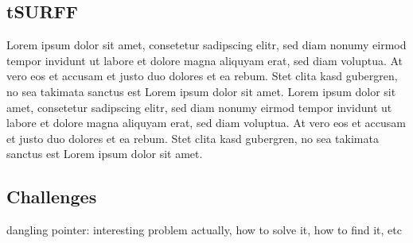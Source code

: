 \subsection{tSURFF}
Lorem ipsum dolor sit amet, consetetur sadipscing elitr, sed diam nonumy eirmod tempor invidunt ut labore et dolore magna aliquyam erat, sed diam voluptua. At vero eos et accusam et justo duo dolores et ea rebum. Stet clita kasd gubergren, no sea takimata sanctus est Lorem ipsum dolor sit amet. Lorem ipsum dolor sit amet, consetetur sadipscing elitr, sed diam nonumy eirmod tempor invidunt ut labore et dolore magna aliquyam erat, sed diam voluptua. At vero eos et accusam et justo duo dolores et ea rebum. Stet clita kasd gubergren, no sea takimata sanctus est Lorem ipsum dolor sit amet.
\subsection{Challenges}
dangling pointer: interesting problem actually, how to solve it, how to find it, etc